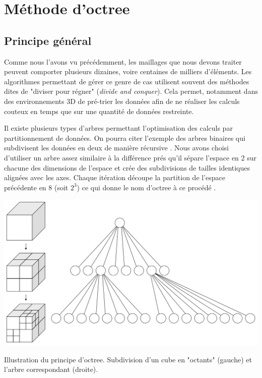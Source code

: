 \section{Méthode d'octree}
\subsection{Principe général} \label{sect_octree_gene}

Comme nous l'avons vu précédemment, les maillages que nous devons traiter peuvent comporter plusieurs dizaines, voire centaines de milliers d'éléments. Les algorithmes permettant de gérer ce genre de cas utilisent souvent des méthodes dites de "diviser pour régner" (\textit{divide and conquer}). Cela permet, notamment dans des environnements 3D de pré-trier les données afin de ne réaliser les calculs couteux en temps que sur une quantité de données restreinte. %


Il existe plusieurs types d'arbres permettant l'optimisation des calculs par partitionnement de données. On pourra citer l'exemple des arbres binaires qui subdivisent les données en deux de manière récursive \cite[p. 318–348]{binaire}. Nous avons choisi d'utiliser un arbre assez similaire à la différence prés qu'il sépare l'espace en 2 sur chacune des dimensions de l'espace et crée des subdivisions de tailles identiques alignées avec les axes. Chaque itération découpe la partition de l'espace précédente en 8 (soit $2^3$) ce qui donne le nom d'\gls{octree} à ce procédé \cite[p. 5]{octree}. 
\begin{figureth}
	\includegraphics[width=0.6\linewidth]{images/octree}
	\caption[Illustration du principe d'\gls{octree}]{Illustration du principe d'\gls{octree}. Subdivision d'un cube en "octants" (gauche) et l'arbre correspondant (droite). \footnotemark}
	\label{octree}
\end{figureth}

